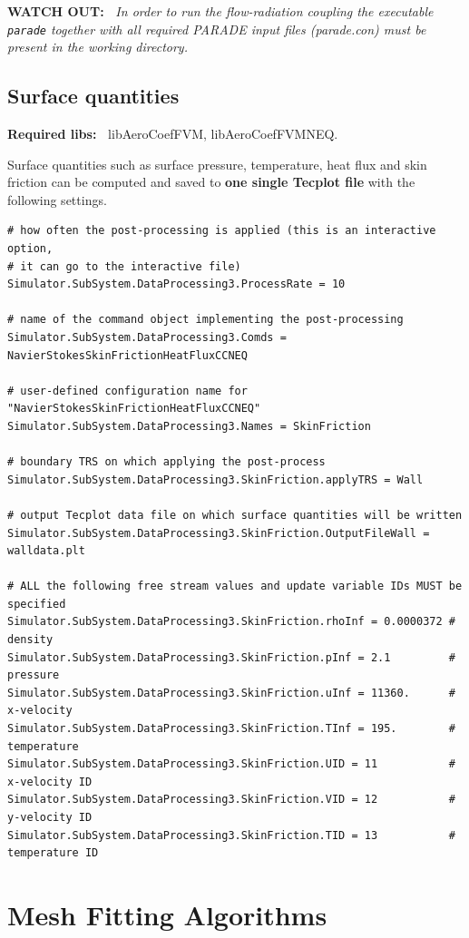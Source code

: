 \documentclass[11pt]{article}
\begin{document}
{\bf WATCH OUT:~} {\it In order to run the flow-radiation coupling the executable {\tt parade} together 
  with all required PARADE input files (parade.con) must be present in the working directory.}

\subsection{Surface quantities}

{\bf Required libs:~} libAeroCoefFVM, libAeroCoefFVMNEQ.

Surface quantities such as surface pressure, temperature, heat flux and skin friction
can be computed and saved to {\bf one single Tecplot file} with the following settings.

\begin{lstlisting}[breaklines]
# how often the post-processing is applied (this is an interactive option, 
# it can go to the interactive file)
Simulator.SubSystem.DataProcessing3.ProcessRate = 10

# name of the command object implementing the post-processing
Simulator.SubSystem.DataProcessing3.Comds = NavierStokesSkinFrictionHeatFluxCCNEQ

# user-defined configuration name for "NavierStokesSkinFrictionHeatFluxCCNEQ"
Simulator.SubSystem.DataProcessing3.Names = SkinFriction

# boundary TRS on which applying the post-process
Simulator.SubSystem.DataProcessing3.SkinFriction.applyTRS = Wall

# output Tecplot data file on which surface quantities will be written
Simulator.SubSystem.DataProcessing3.SkinFriction.OutputFileWall = walldata.plt

# ALL the following free stream values and update variable IDs MUST be specified
Simulator.SubSystem.DataProcessing3.SkinFriction.rhoInf = 0.0000372 # density
Simulator.SubSystem.DataProcessing3.SkinFriction.pInf = 2.1         # pressure
Simulator.SubSystem.DataProcessing3.SkinFriction.uInf = 11360.      # x-velocity
Simulator.SubSystem.DataProcessing3.SkinFriction.TInf = 195.        # temperature
Simulator.SubSystem.DataProcessing3.SkinFriction.UID = 11           # x-velocity ID
Simulator.SubSystem.DataProcessing3.SkinFriction.VID = 12           # y-velocity ID
Simulator.SubSystem.DataProcessing3.SkinFriction.TID = 13           # temperature ID
\end{lstlisting}

\section{Mesh Fitting Algorithms}
\end{document}
